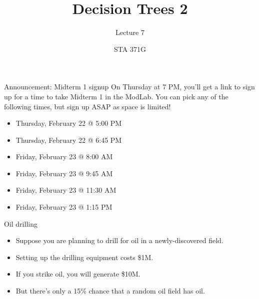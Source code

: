 \documentclass{beamer}\usepackage[]{graphicx}\usepackage[]{color}
\title{Decision Trees 2}
\subtitle{Lecture 7}
\author{STA 371G}
\begin{document}
  
  

  \frame{\maketitle}



  \begin{darkframes}
    

    \begin{frame}{Announcement: Midterm 1 signup}
      On Thursday at 7 PM, you'll get a link to sign up for a time to take Midterm 1 in the ModLab. You can pick any of the following times, but sign up ASAP as space is limited!
      \begin{itemize}
        \item Thursday, February 22 @ 5:00 PM
        \item Thursday, February 22 @ 6:45 PM
        \item Friday, February 23 @ 8:00 AM
        \item Friday, February 23 @ 9:45 AM
        \item Friday, February 23 @ 11:30 AM
        \item Friday, February 23 @ 1:15 PM
      \end{itemize}
    \end{frame}

    \begin{frame}{Oil drilling}
      \begin{itemize}[<+->]
        \item Suppose you are planning to drill for oil in a newly-discovered field.
        \item Setting up the drilling equipment costs \$1M.
        \item If you strike oil, you will generate \$10M.
        \item But there's only a 15\% chance that a random oil field has oil.
      \end{itemize}
      \lc
    \end{frame}


\end{darkframes}
\end{document}
